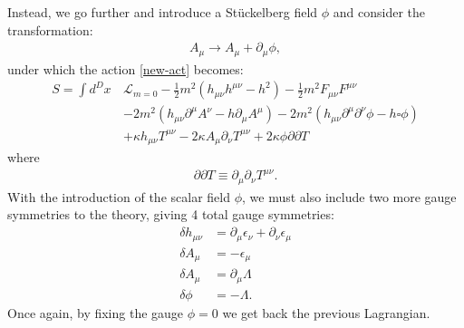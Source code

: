 \documentclass{book}
\theoremstyle{definition}
\newcommand{\p}{\partial}
\newcommand{\lag}{\mathcal{L}}
\newcommand{\nn}{\nonumber}
\newcommand{\f}[2]{\frac{#1}{#2}}
\newcommand{\lp}{\left(}
\newcommand{\rp}{\right)}
\begin{document}
Instead, we go further and introduce a St\"{u}ckelberg field $\phi$ and consider the transformation:
\begin{align}
A_\mu \to A_\mu + \p_\mu \phi,
\end{align}
under which the action \eqref{new-act} becomes:
\begin{align}
S = \int d^Dx\, &\lag_{m=0} - \f{1}{2}m^2\lp h_{\mu\nu}h^{\mu\nu} - h^2 \rp - \f{1}{2}m^2 F_{\mu\nu}F^{\mu\nu}\nn\\
&-2m^2\lp h_{\mu\nu} \p^\mu A^\nu - h\p_\mu A^\mu \rp -2m^2\lp h_{\mu\nu}\p^\mu \p^\nu \phi - h\square \phi \rp\nn\\
&+\kappa h_{\mu\nu}T^{\mu\nu} - 2\kappa A_\mu \p_\nu T^{\mu\nu} + 2\kappa \phi \p \p T
\end{align}
where 
\begin{align}
\p \p T \equiv \p_\mu \p_\nu T^{\mu\nu}.
\end{align}
With the introduction of the scalar field $\phi$, we must also include two more gauge symmetries to the theory, giving 4 total gauge symmetries:
\begin{align}
\delta h_{\mu\nu} &= \p_\mu \epsilon_\nu + \p_\nu\epsilon_\mu\nn\\
\delta A_\mu &= -\epsilon_\mu \nn\\
\delta A_\mu &= \p_\mu \Lambda\nn\\
\delta \phi &= -\Lambda.
\end{align}
Once again, by fixing the gauge $\phi = 0$ we get back the previous Lagrangian. \\
\end{document}
